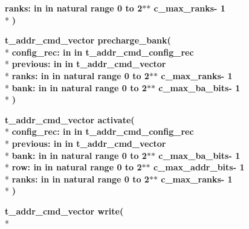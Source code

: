 \begin{DoxyCompactItemize}
{\bfseries \textcolor{vhdlchar}{ranks\+: }\textcolor{stringliteral}{in }\textcolor{vhdlchar}{in natural   range  0 to  2$\ast$$\ast$   c\+\_\+max\+\_\+ranks-\/ 1}}\\*
{\bfseries  )} 
\item 
{\bfseries {\bfseries \textcolor{vhdlchar}{t\+\_\+addr\+\_\+cmd\+\_\+vector}\textcolor{vhdlchar}{ }}} {\bf precharge\+\_\+bank}{\bfseries  ( }\\*
{\bfseries \textcolor{vhdlchar}{config\+\_\+rec\+: }\textcolor{stringliteral}{in }\textcolor{vhdlchar}{in t\+\_\+addr\+\_\+cmd\+\_\+config\+\_\+rec}}\\*
{\bfseries \textcolor{vhdlchar}{previous\+: }\textcolor{stringliteral}{in }\textcolor{vhdlchar}{in t\+\_\+addr\+\_\+cmd\+\_\+vector}}\\*
{\bfseries \textcolor{vhdlchar}{ranks\+: }\textcolor{stringliteral}{in }\textcolor{vhdlchar}{in natural   range  0 to  2$\ast$$\ast$   c\+\_\+max\+\_\+ranks-\/ 1}}\\*
{\bfseries \textcolor{vhdlchar}{bank\+: }\textcolor{stringliteral}{in }\textcolor{vhdlchar}{in natural   range  0 to  2$\ast$$\ast$   c\+\_\+max\+\_\+ba\+\_\+bits-\/ 1}}\\*
{\bfseries  )} 
\item 
{\bfseries {\bfseries \textcolor{vhdlchar}{t\+\_\+addr\+\_\+cmd\+\_\+vector}\textcolor{vhdlchar}{ }}} {\bf activate}{\bfseries  ( }\\*
{\bfseries \textcolor{vhdlchar}{config\+\_\+rec\+: }\textcolor{stringliteral}{in }\textcolor{vhdlchar}{in t\+\_\+addr\+\_\+cmd\+\_\+config\+\_\+rec}}\\*
{\bfseries \textcolor{vhdlchar}{previous\+: }\textcolor{stringliteral}{in }\textcolor{vhdlchar}{in t\+\_\+addr\+\_\+cmd\+\_\+vector}}\\*
{\bfseries \textcolor{vhdlchar}{bank\+: }\textcolor{stringliteral}{in }\textcolor{vhdlchar}{in natural   range  0 to  2$\ast$$\ast$   c\+\_\+max\+\_\+ba\+\_\+bits-\/ 1}}\\*
{\bfseries \textcolor{vhdlchar}{row\+: }\textcolor{stringliteral}{in }\textcolor{vhdlchar}{in natural   range  0 to  2$\ast$$\ast$   c\+\_\+max\+\_\+addr\+\_\+bits-\/ 1}}\\*
{\bfseries \textcolor{vhdlchar}{ranks\+: }\textcolor{stringliteral}{in }\textcolor{vhdlchar}{in natural   range  0 to  2$\ast$$\ast$   c\+\_\+max\+\_\+ranks-\/ 1}}\\*
{\bfseries  )} 
\item 
{\bfseries {\bfseries \textcolor{vhdlchar}{t\+\_\+addr\+\_\+cmd\+\_\+vector}\textcolor{vhdlchar}{ }}} {\bf write}{\bfseries  ( }\\*

\end{DoxyCompactItemize}
